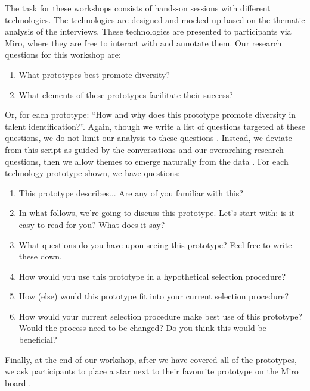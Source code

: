 The task for these workshops consists of hands-on sessions with different technologies. The technologies are designed and mocked up based on the thematic analysis of the interviews. These technologies are presented to participants via Miro, where they are free to interact with and annotate them. Our research questions for this workshop are:

\begin{enumerate}
    \item What prototypes best promote diversity?
    \item What elements of these prototypes facilitate their success?
\end{enumerate}

Or, for each prototype: ``How and why does this prototype promote diversity in talent identification?''. Again, though we write a list of questions targeted at these questions, we do not limit our analysis to these questions \cite{braun_using_2006}. Instead, we deviate from this script as guided by the conversations and our overarching research questions, then we allow themes to emerge naturally from the data \cite{braun_using_2006}. For each technology prototype shown, we have questions:

\begin{enumerate}
    \item This prototype describes... Are any of you familiar with this?
    \item In what follows, we're going to discuss this prototype. Let's start with: is it easy to read for you? What does it say? 
    \item What questions do you have upon seeing this prototype? Feel free to write these down.
    \item How would you use this prototype in a hypothetical selection procedure?
    \item How (else) would this prototype fit into your current selection procedure?
    \item How would your current selection procedure make best use of this prototype? Would the process need to be changed? Do you think this would be beneficial?
\end{enumerate}

Finally, at the end of our workshop, after we have covered all of the prototypes, we ask participants to place a star next to their favourite prototype on the Miro board \cite{Gatian_1994,Griffiths_Johnson_Hartley_2007}.